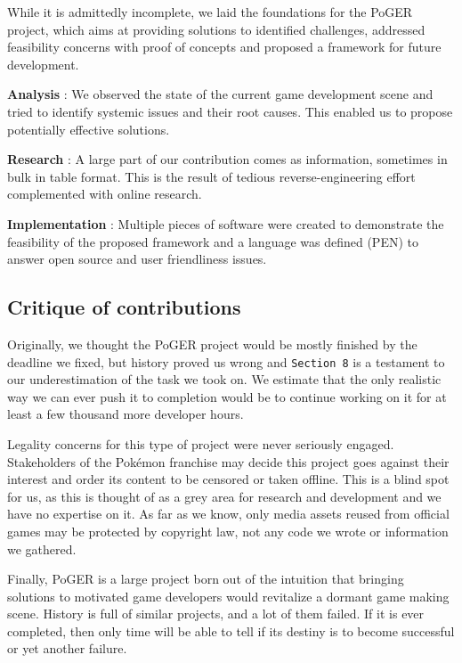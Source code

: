 \documentclass[11pt]{article}
\begin{document}
{While it is admittedly incomplete, we laid the foundations for the PoGER project, which aims at providing solutions to identified challenges, addressed feasibility concerns with proof of concepts and proposed a framework for future development.

\textbf{Analysis} : We observed the state of the current game development scene and tried to identify systemic issues and their root causes. This enabled us to propose potentially effective solutions.

\textbf{Research} : A large part of our contribution comes as information, sometimes in bulk in table format. This is the result of tedious reverse-engineering effort complemented with online research.

\textbf{Implementation} : Multiple pieces of software were created to demonstrate the feasibility of the proposed framework and a language was defined (PEN) to answer open source and user friendliness issues.


\subsection{Critique of contributions}

Originally, we thought the PoGER project would be mostly finished by the deadline we fixed, but history proved us wrong and \texttt{Section 8} is a testament to our underestimation of the task we took on. We estimate that the only realistic way we can ever push it to completion would be to continue working on it for at least a few thousand more developer hours.

Legality concerns for this type of project were never seriously engaged. Stakeholders of the Pokémon franchise may decide this project goes against their interest and order its content to be censored or taken offline. This is a blind spot for us, as this is thought of as a grey area for research and development and we have no expertise on it. As far as we know, only media assets reused from official games may be protected by copyright law, not any code we wrote or information we gathered.

Finally, PoGER is a large project born out of the intuition that bringing solutions to motivated game developers would revitalize a dormant game making scene. History is full of similar projects, and a lot of them failed. If it is ever completed, then only time will be able to tell if its destiny is to become successful or yet another failure.





}
\end{document}
